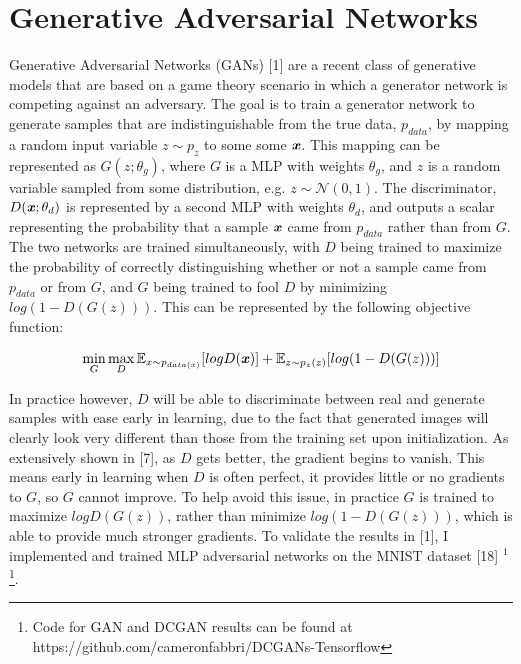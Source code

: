 \documentclass[9pt]{article}
\begin{document}
\section{Generative Adversarial Networks}
\noindent Generative Adversarial Networks (GANs) [1] are a recent class of generative models that are based on a game theory scenario in which a generator
network is competing against an adversary. The goal is to train a generator network to generate samples that are indistinguishable from the true data, $p_{data}$,
by mapping a random input variable $z \sim p_z$ to some some $\textbf{\textit{x}}$. This mapping can be represented as $G(z;\theta_g)$, where $G$ is a MLP with weights $\theta_g$, and $z$ is a random
variable sampled from some distribution, e.g. $z \sim \mathcal{N}(0,1)$. The discriminator, $D(\textbf{\textit{x}}; \theta_d)$ is represented by a second MLP with weights
$\theta_d$, and outputs a scalar representing the probability that a sample $\textbf{\textit{x}}$ came from $p_{data}$ rather than from $G$. The two networks are trained
simultaneously, with $D$ being trained to maximize the probability of correctly distinguishing whether or not a sample came from $p_{data}$ or from $G$, and $G$ being 
trained to fool $D$ by minimizing $log(1-D(G(z)))$. This can be represented by the following objective function:

\[\min\limits_{G}\max\limits_{D} \mathbb{E}_{x \sim p_{data(x)}} [logD(\textbf{\textit{x}})] + \mathbb{E}_{z \sim p_z(z)}[log(1 - D(G(z)))]\]

\noindent In practice however, $D$ will be able to discriminate between real and generate samples with
ease early in learning, due to the fact that generated images will clearly look very different than those from the training set upon initialization. As extensively shown in [7],
as $D$ gets better, the gradient begins to vanish. This means early in learning when $D$ is often perfect, it provides little or no gradients to $G$, so $G$ cannot improve.
To help avoid this issue, in practice $G$ is trained to maximize $logD(G(z))$, rather than minimize $log(1-D(G(z)))$, which is able to provide much stronger gradients. To validate the
results in [1], I implemented and trained MLP adversarial networks on the MNIST dataset [18] $^1$\footnote{Code for GAN and DCGAN results can be found
at https://github.com/cameronfabbri/DCGANs-Tensorflow}.\newline
\end{document}
